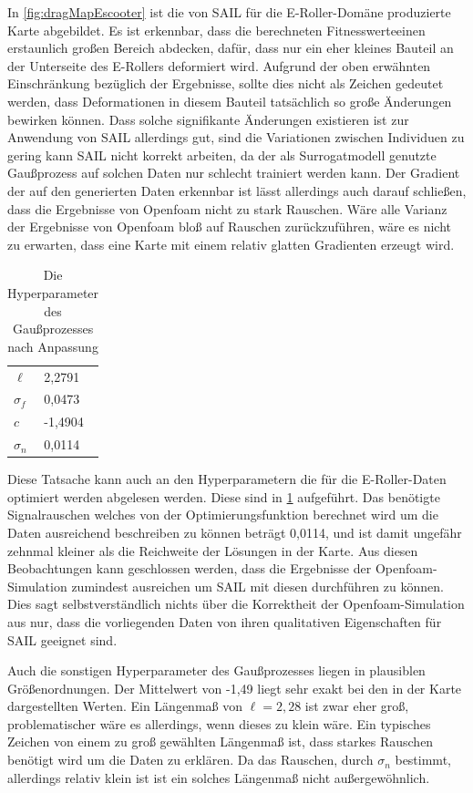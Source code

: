 In \cref{fig:dragMapEscooter} ist die von SAIL für die E-Roller-Domäne produzierte Karte abgebildet.
Es ist erkennbar, dass die berechneten Fitnesswerteeinen erstaunlich großen Bereich abdecken, dafür, dass nur ein eher kleines Bauteil an der Unterseite des E-Rollers deformiert wird.
Aufgrund der oben erwähnten Einschränkung bezüglich der Ergebnisse, sollte dies nicht als Zeichen gedeutet werden, dass Deformationen in diesem Bauteil tatsächlich so große Änderungen bewirken können.
Dass solche signifikante Änderungen existieren ist zur Anwendung von SAIL allerdings gut, sind die Variationen zwischen Individuen zu gering kann SAIL nicht korrekt arbeiten, da der als Surrogatmodell genutzte Gaußprozess auf solchen Daten nur schlecht trainiert werden kann.
Der Gradient der auf den generierten Daten erkennbar ist lässt allerdings auch darauf schließen, dass die Ergebnisse von Openfoam nicht zu stark Rauschen.
Wäre alle Varianz der Ergebnisse von Openfoam bloß auf Rauschen zurückzuführen, wäre es nicht zu erwarten, dass eine Karte mit einem relativ glatten Gradienten erzeugt wird.
\begin{table}[h]
	\centering
	\begin{tabularx}{.25\textwidth}{ll}\hline
		$\ell$ & 2,2791 \\
		$\sigma_f$ & 0,0473 \\
		$c$ & -1,4904 \\
		$\sigma_n$ & 0,0114 \\
	\end{tabularx}
	\label{tab:hyperparamsEscooter}
	\caption{Die Hyperparameter des Gaußprozesses nach Anpassung}
\end{table}
Diese Tatsache kann auch an den Hyperparametern die für die E-Roller-Daten optimiert werden abgelesen werden.
Diese sind in \cref{tab:hyperparamsEscooter} aufgeführt.
Das benötigte Signalrauschen welches von der Optimierungsfunktion berechnet wird um die Daten ausreichend beschreiben zu können beträgt 0,0114, und ist damit ungefähr zehnmal kleiner als die Reichweite der Lösungen in der Karte.
Aus diesen Beobachtungen kann geschlossen werden, dass die Ergebnisse der Openfoam-Simulation zumindest ausreichen um SAIL mit diesen durchführen zu können.
Dies sagt selbstverständlich nichts über die Korrektheit der Openfoam-Simulation aus nur, dass die vorliegenden Daten von ihren qualitativen Eigenschaften für SAIL geeignet sind.

Auch die sonstigen Hyperparameter des Gaußprozesses liegen in plausiblen Größenordnungen.
Der Mittelwert von -1,49 liegt sehr exakt bei den in der Karte dargestellten Werten.
Ein Längenmaß von $\ell=2,28$ ist zwar eher groß, problematischer wäre es allerdings, wenn dieses zu klein wäre.
Ein typisches Zeichen von einem zu groß gewählten Längenmaß ist, dass starkes Rauschen benötigt wird um die Daten zu erklären.
Da das Rauschen, durch $\sigma_n$ bestimmt, allerdings relativ klein ist ist ein solches Längenmaß nicht außergewöhnlich.

